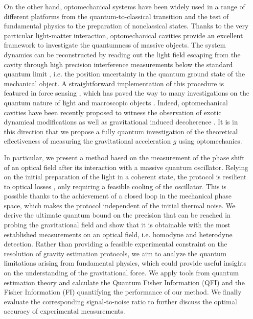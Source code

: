 \documentclass[aps,twocolumn,preprintnumbers,amsmath,amssymb]{revtex4}
\begin{document}
On the other hand, optomechanical systems have been widely used in a range of different platforms from the quantum-to-classical transition \cite{penrose2003,armata2016} and the test of fundamental physics \cite{bahrami2014} to the preparation of nonclassical states\cite{bose1997,wollman2015}.
Thanks to the very particular light-matter interaction, optomechanical cavities provide an excellent framework to investigate the quantumness of massive objects. The system dynamics can be reconstructed by reading out the light field escaping from the cavity through high precision interference measurements below the standard quantum limit \cite{teufel2009}, i.e. the position uncertainty in the quantum ground state of the mechanical object. A straightforward implementation of this procedure is featured in force sensing \cite{caves1980,braginsky1995,gavartin2012}, which has paved the way to many investigations on the quantum nature of light and macroscopic objects \cite{safavi2013}. Indeed, optomechanical cavities have been recently proposed to witness the observation of exotic dynamical modifications \cite{pikovski2012, latmiral2016} as well as gravitational induced decoherence \cite{penrose1998}. It is in this direction that we propose a fully quantum investigation of the theoretical effectiveness of measuring the gravitational acceleration $g$ using optomechanics.

In particular, we present a method based on the measurement of the phase shift of an optical field after its interaction with a massive quantum oscillator. Relying on the initial preparation of the light in a coherent state, the protocol is resilient to optical losses \cite{aspelmeyer2014}, only requiring a feasible cooling of the oscillator. This is possible thanks to the achievement of a closed loop in the mechanical phase space, which makes the protocol independent of the initial thermal noise. We derive the ultimate quantum bound on the precision that can be reached in probing the gravitational field and show that it is obtainable with the most established measurements on an optical field, i.e. homodyne and heterodyne detection. Rather than providing a feasible experimental constraint on the resolution of gravity estimation protocols, we aim to analyze the quantum limitations arising from fundamental physics, which could provide useful insights on the understanding of the gravitational force. We apply tools from quantum estimation theory and calculate the Quantum Fisher Information (QFI) and the Fisher Information (FI) quantifying the performance of our method. We finally evaluate the corresponding signal-to-noise ratio to further discuss the optimal accuracy of experimental measurements. 
\end{document}
